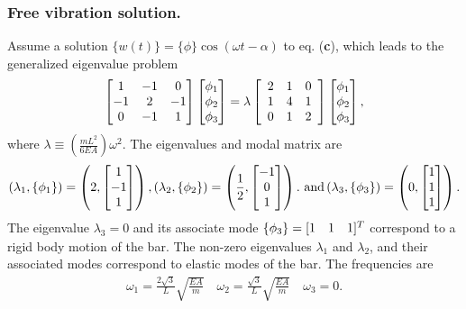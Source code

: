 \documentclass{AeroStructure-ERJohnson}
\begin{document}
\begin{example*}
\subsubsection{Free vibration solution.} Assume a solution $\{w(t)\}=\{\phi\} \cos (\omega t-\alpha)$ to eq. (\textbf{c}), which leads to the generalized eigenvalue problem
\begin{align}\label{ex18.2h}
\left[\begin{array}{@{}ccc@{}}1 & -1 & 0 \\-1 & 2 & -1 \\0 & -1 & 1\end{array}\right]\left[\begin{array}{@{}l@{}}\phi_{1} \\\phi_{2} \\\phi_{3}\end{array}\right]=\lambda\left[\begin{array}{lll}2 & 1 & 0 \\1 & 4 & 1 \\0 & 1 & 2\end{array}\right]\left[\begin{array}{@{}l@{}}\phi_{1} \\\phi_{2} \\\phi_{3}\end{array}\right],
\end{align}
where $\lambda \equiv\left(\frac{m L^{2}}{6 E A}\right) \omega^{2}$. The eigenvalues and modal matrix are
\begin{align}\label{ex18.2i}
\left(\lambda_{1},\left\{\phi_{1}\right\}\right)=\left(2,\left[\begin{array}{@{}c@{}}1 \\-1 \\1\end{array}\right]\right), \left(\lambda_{2},\left\{\phi_{2}\right\}\right)=\left(\frac{1}{2},\left[\begin{array}{@{}c@{}}-1 \\0 \\1\end{array}\right]\right).\ \text{and} \left(\lambda_{3},\left\{\phi_{3}\right\}\right)=\left(0,\left[\begin{array}{@{}l@{}}1 \\1 \\1\end{array}\right]\right).
\end{align}
The eigenvalue $\lambda_{3}=0$ and its associate mode $\{\phi_{3}\}=[\begin{array}{@{}lll@{}}1 & 1 & 1\end{array}]^{T}$ correspond to a rigid body motion of the bar. The non-zero eigenvalues $\lambda_{1}$ and $\lambda_{2}$, and their associated modes correspond to elastic modes of the bar. The frequencies are
\begin{align}\label{ex18.2j}
\omega_{1}=\frac{2 \sqrt{3}}{L} \sqrt{\frac{E A}{m}} \quad \omega_{2}=\frac{\sqrt{3}}{L} \sqrt{\frac{E A}{m}} \quad \omega_{3}=0.
\end{align}


\end{example*}
\end{document}
